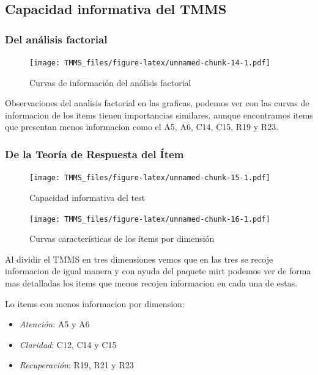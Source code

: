 \documentclass[
  10pt,
  spanish,
]{article}
\providecommand{\tightlist}{%
  \setlength{\itemsep}{0pt}\setlength{\parskip}{0pt}}
\begin{document}
\hypertarget{capacidad-informativa-del-tmms}{%
\subsection{Capacidad informativa del
TMMS}\label{capacidad-informativa-del-tmms}}

\hypertarget{del-anuxe1lisis-factorial}{%
\subsubsection{Del análisis factorial}\label{del-anuxe1lisis-factorial}}

\begin{figure}
\centering
\texttt{[image: TMMS\_files/figure-latex/unnamed-chunk-14-1.pdf]}
\caption{Curvas de información del análisis factorial}
\end{figure}

Observaciones del analisis factorial en las graficas, podemos ver con
las curvas de informacion de los items tienen importancias similares,
aunque encontramos items que presentan menos informacion como el A5, A6,
C14, C15, R19 y R23.

\hypertarget{de-la-teoruxeda-de-respuesta-del-uxedtem}{%
\subsubsection{De la Teoría de Respuesta del
Ítem}\label{de-la-teoruxeda-de-respuesta-del-uxedtem}}

\begin{figure}
\centering
\texttt{[image: TMMS\_files/figure-latex/unnamed-chunk-15-1.pdf]}
\caption{Capacidad informativa del test}
\end{figure}

\break

\begin{figure}
\centering
\texttt{[image: TMMS\_files/figure-latex/unnamed-chunk-16-1.pdf]}
\caption{Curvas características de los ítems por dimensión}
\end{figure}

Al dividir el TMMS en tres dimensiones vemos que en las tres se recoje
informacion de igual manera y con ayuda del paquete mirt podemos ver de
forma mas detalladas los items que menos recojen informacion en cada una
de estas.

Lo items con menos informacion por dimension:

\begin{itemize}
\tightlist
\item
  \emph{Atención}: A5 y A6
\item
  \emph{Claridad}: C12, C14 y C15
\item
  \emph{Recuperación}: R19, R21 y R23
\end{itemize}
\end{document}

